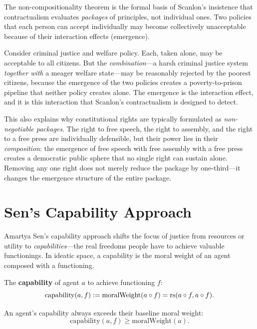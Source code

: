 \begin{interpretation}
The non-compositionality theorem is the formal basis of Scanlon's insistence
that contractualism evaluates \emph{packages} of principles, not individual
ones. Two policies that each person can accept individually may become
collectively unacceptable because of their interaction effects (emergence).

Consider criminal justice and welfare policy. Each, taken alone, may be
acceptable to all citizens. But the \emph{combination}---a harsh criminal
justice system \emph{together with} a meager welfare state---may be
reasonably rejected by the poorest citizens, because the emergence of the
two policies creates a poverty-to-prison pipeline that neither policy creates
alone. The emergence is the interaction effect, and it is this interaction
that Scanlon's contractualism is designed to detect.

This also explains why constitutional rights are typically formulated as
\emph{non-negotiable packages}. The right to free speech, the right to
assembly, and the right to a free press are individually defensible, but
their power lies in their \emph{composition}: the emergence of free speech
with free assembly with a free press creates a democratic public sphere
that no single right can sustain alone. Removing any one right does not
merely reduce the package by one-third---it changes the emergence structure
of the entire package.
\end{interpretation}

\section{Sen's Capability Approach}
\label{sec:sen}

Amartya Sen's capability approach shifts the focus of justice from resources
or utility to \emph{capabilities}---the real freedoms people have to achieve
valuable functionings. In ideatic space, a capability is the moral weight
of an agent composed with a functioning.

\begin{definition}[Capability]
\label{def:capability}
The \textbf{capability} of agent $a$ to achieve functioning $f$:
\[
  \mathrm{capability}(a, f) := \mathrm{moralWeight}(a \circ f) = \mathrm{rs}(a \circ f, a \circ f).
\]
\end{definition}

\begin{theorem}
\label{thm:capability-baseline}
An agent's capability always exceeds their baseline moral weight:
\[
  \mathrm{capability}(a, f) \geq \mathrm{moralWeight}(a).
\]
\end{theorem}

